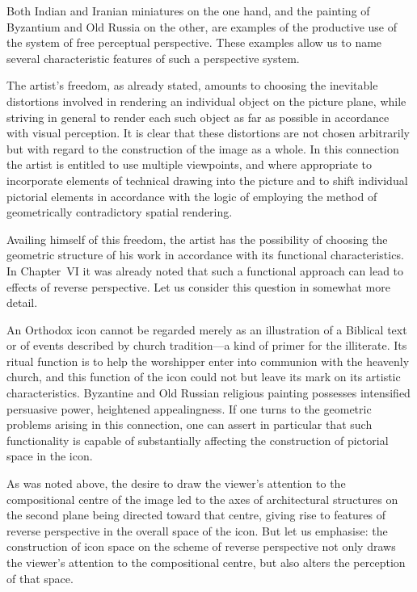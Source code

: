 
Both Indian and Iranian miniatures on the one hand, and the painting of Byzantium
and Old Russia on the other, are examples of the productive use of the system of
free perceptual perspective. These examples allow us to name several characteristic
features of such a perspective system.

The artist's freedom, as already stated, amounts to choosing the inevitable
distortions involved in rendering an individual object on the picture plane, while
striving in general to render each such object as far as possible in accordance with
visual perception. It is clear that these distortions are not chosen arbitrarily but
with regard to the construction of the image as a whole. In this connection the
artist is entitled to use multiple viewpoints, and where appropriate to incorporate
elements of technical drawing into the picture and to shift individual pictorial
elements in accordance with the logic of employing the method of geometrically
contradictory spatial rendering.

Availing himself of this freedom, the artist has the possibility of choosing the
geometric structure of his work in accordance with its functional characteristics.
In Chapter~VI it was already noted that such a functional approach can lead to
effects of reverse perspective. Let us consider this question in somewhat more
detail.

An Orthodox icon cannot be regarded merely as an illustration of a Biblical text or
of events described by church tradition---a kind of primer for the illiterate. Its
ritual function is to help the worshipper enter into communion with the heavenly
church, and this function of the icon could not but leave its mark on its artistic
characteristics. Byzantine and Old Russian religious painting possesses intensified
persuasive power, heightened appealingness. If one turns to the geometric problems
arising in this connection, one can assert in particular that such functionality is
capable of substantially affecting the construction of pictorial space in the icon.

As was noted above, the desire to draw the viewer's attention to the compositional
centre of the image led to the axes of architectural structures on the second plane
being directed toward that centre, giving rise to features of reverse perspective in
the overall space of the icon. But let us emphasise: the construction of icon space
on the scheme of reverse perspective not only draws the viewer's attention to the
compositional centre, but also alters the perception of that space.

